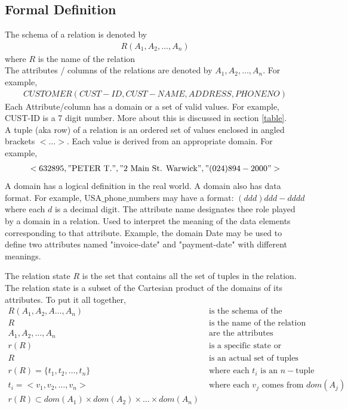 \documentclass[a4paper]{article}
\theoremstyle{plain}
\theoremstyle{definition}
\newtheorem{defn}{Definition}[section]
\theoremstyle{remark}
\begin{document}
	\subsection{Formal Definition}
	The schema of a relation is denoted by
	\begin{align*}
		R(A_1,A_2,\ldots,A_n)
	\end{align*}
	where $R$ is the name of the relation \\
	The attributes / columns of the relations are denoted by $A_1,A_2,\ldots,A_n$.
	For example, 
	\begin{align*}
		CUSTOMER(CUST-ID,CUST-NAME,ADDRESS,PHONENO)
	\end{align*}
	Each Attribute/column has a domain or a set of valid values. For example, CUST-ID is a 7 digit number. More about this is discussed in section \ref{table}.\\
	A tuple (aka row) of a relation is an ordered set of values enclosed in angled brackets $<\ldots>$. Each value is derived from an appropriate domain. For example,
	\begin{align*}
		<632895, "\text{PETER T.}", "\text{2 Main St. Warwick}", "(024) 894-2000">
	\end{align*}
	A domain has a logical definition in the real world. A domain also has data format. For example, USA$\_$phone$\_$numbers may have a format: $(ddd)ddd-dddd$ where each $d $ is a decimal digit. The attribute name designates thee role played by a domain in a relation. Used to interpret the meaning of the data elements corresponding to that attribute. Example, the domain Date may be used to define two attributes named "invoice-date" and "payment-date" with different meanings.
	\begin{tcolorbox}[colback=black!3!white,colframe=black!60!white,title=\begin{defn}Relation State \label{Relation State}\end{defn}]
	The relation state $R$ is the set that contains all the set of tuples in the relation. The relation state is a subset of the Cartesian product of the domains of its attributes. To put it all together,
	\begin{align*}
		R(A_1,A_2,A\ldots,A_n) &\text{ is the schema of the relation} \\
		R &\text{ is the name of the relation} \\
		A_1,A_2,\ldots,A_n &\text{ are the attributes (columns) of the relation} \\
		r(R) &\text{ is a specific state or instance of relation } \\
		R &\text{ is an actual set of tuples (rows)} \\
		r(R) = \{t_1,t_2,\ldots,t_n\} &\text{ where each $t_i$ is an $n-$tuple} \\
		t_i = <v_1,v_2,\ldots,v_n> &\text{ where each $v_j$ comes from }dom(A_j) \\
		r(R) \subset dom(A_1)\times dom(A_2) \times \ldots \times dom(A_n)
	\end{align*}
	\end{tcolorbox}
\end{document}
